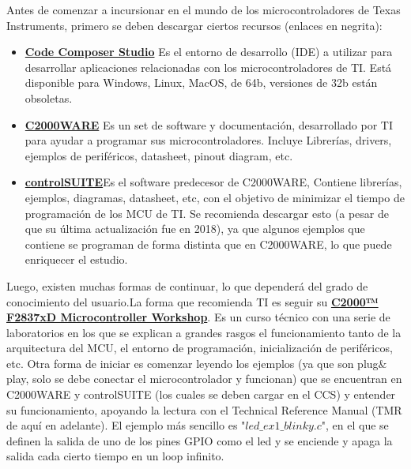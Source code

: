 Antes de comenzar a incursionar en el mundo de los microcontroladores de Texas Instruments, primero se deben descargar ciertos recursos (enlaces en negrita):
\begin{itemize}
	\item \href{https://software-dl.ti.com/ccs/esd/documents/ccs_downloads.html}{\textbf{Code Composer Studio}} Es el entorno de desarrollo (IDE) a utilizar para desarrollar aplicaciones relacionadas con los microcontroladores de TI. Está disponible para Windows, Linux, MacOS, de 64b, versiones de 32b están obsoletas.
	\item \href{http://www.ti.com/tool/download/C2000WARE}{\textbf{C2000WARE}} Es un set de software y documentación, desarrollado por TI para ayudar a programar sus microcontroladores. Incluye Librerías, drivers, ejemplos de periféricos, datasheet, pinout diagram, etc.
	\item \href{http://www.ti.com/tool/CONTROLSUITE}{\textbf{controlSUITE}}Es el software predecesor de C2000WARE, Contiene librerías, ejemplos, diagramas, datasheet, etc, con el objetivo de minimizar el tiempo de programación de los MCU de TI. Se recomienda descargar esto (a pesar de que su última actualización fue en 2018), ya que algunos ejemplos que contiene se programan de forma distinta que en C2000WARE, lo que puede enriquecer el estudio.
\end{itemize}
Luego, existen muchas formas de continuar, lo que dependerá del grado de conocimiento del usuario.La forma que recomienda TI es seguir su \href{https://training.ti.com/c2000-f2837xd-microcontroller-workshop?context=1137791-1137781}{\textbf{C2000™ F2837xD Microcontroller Workshop}}. Es un curso técnico con una serie de laboratorios en los que se explican a grandes rasgos el funcionamiento tanto de la arquitectura del MCU, el entorno de programación, inicialización de periféricos, etc.
\justify
Otra forma de iniciar es comenzar leyendo los ejemplos (ya que son plug$\&$play, solo se debe conectar el microcontrolador y funcionan) que se encuentran en C2000WARE y controlSUITE (los cuales se deben cargar en el CCS) y entender su funcionamiento, apoyando la lectura con el Technical Reference Manual (TMR de aquí en adelante). El ejemplo más sencillo es "$led\_ex1\_blinky.c$", en el que se definen la salida de uno de los pines GPIO como el led y se enciende y apaga la salida cada cierto tiempo en un loop infinito.